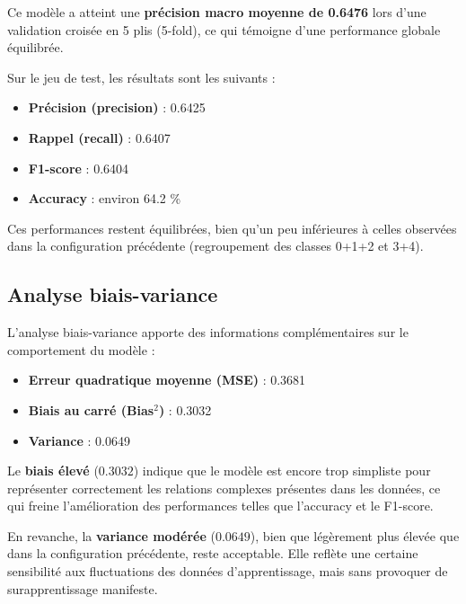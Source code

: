 \documentclass[a4paper,12pt]{article}
\begin{document}
Ce modèle a atteint une \textbf{précision macro moyenne de 0.6476} lors d'une validation croisée en 5 plis (5-fold), ce qui témoigne d'une performance globale équilibrée.
 
\medskip
 
Sur le jeu de test, les résultats sont les suivants :

\begin{itemize}

    \item \textbf{Précision (precision)} : 0.6425

    \item \textbf{Rappel (recall)} : 0.6407

    \item \textbf{F1-score} : 0.6404

    \item \textbf{Accuracy} : environ 64.2 \%

\end{itemize}
 
Ces performances restent équilibrées, bien qu’un peu inférieures à celles observées dans la configuration précédente (regroupement des classes 0+1+2 et 3+4).
 
\subsection*{Analyse biais-variance}
 
L’analyse biais-variance apporte des informations complémentaires sur le comportement du modèle :
 
\begin{itemize}

    \item \textbf{Erreur quadratique moyenne (MSE)} : 0.3681

    \item \textbf{Biais au carré (Bias$^2$)} : 0.3032

    \item \textbf{Variance} : 0.0649

\end{itemize}
 
Le \textbf{biais élevé} ($0.3032$) indique que le modèle est encore trop simpliste pour représenter correctement les relations complexes présentes dans les données, ce qui freine l'amélioration des performances telles que l’accuracy et le F1-score.
 
En revanche, la \textbf{variance modérée} ($0.0649$), bien que légèrement plus élevée que dans la configuration précédente, reste acceptable. Elle reflète une certaine sensibilité aux fluctuations des données d’apprentissage, mais sans provoquer de surapprentissage manifeste.
 
\end{document}

